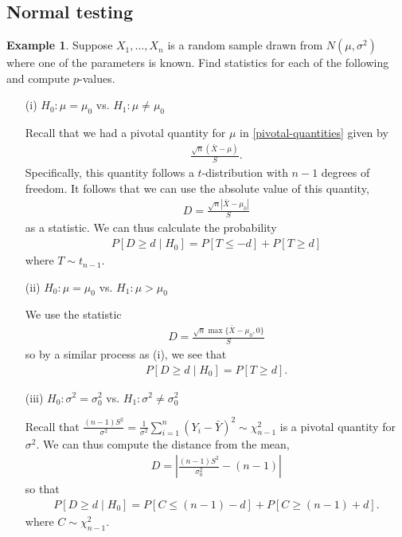 \documentclass[11pt]{amsart}
\theoremstyle{definition}
\newtheorem{example}[theorem]{Example}
\numberwithin{equation}{section}
\begin{document}
\subsection{Normal testing}
\begin{example}
    Suppose $X_1,\ldots,X_n$ is a random sample drawn from $N(\mu,\sigma^2)$ where one of the parameters is known. Find statistics for each of the following and compute $p$-values.
    \begin{enumerate}
        \item [(i)] $H_0:\mu=\mu_0$ vs. $H_1:\mu\ne \mu_0$

        Recall that we had a pivotal quantity for $\mu$ in \ref{pivotal-quantities} given by
        \begin{align*}
            \frac{\sqrt{n}(\bar X-\mu)}{S}.
        \end{align*}
        Specifically, this quantity follows a $t$-distribution with $n-1$ degrees of freedom. It follows that we can use the absolute value of this quantity, 
        \begin{align*}
            D=\frac{\sqrt{n}|\bar X-\mu_0|}{S}
        \end{align*}
        as a statistic. We can thus calculate the probability
        \begin{align*}
            P[D\ge d\mid H_0]=P[T\le -d]+P[T\ge d]
        \end{align*}
        where $T\sim t_{n-1}$.
        \item [(ii)] $H_0:\mu=\mu_0$ vs. $H_1:\mu>\mu_0$

        We use the statistic 
        \begin{align*}
            D=\frac{\sqrt{n}\max\{\bar X-\mu_0,0\}}{S}
        \end{align*}
        so by a similar process as (i), we see that
        \begin{align*}
            P[D\ge d\mid H_0]=P[T\ge d].
        \end{align*}
        \item [(iii)] $H_0:\sigma^2=\sigma^2_0$ vs. $H_1:\sigma^2\ne \sigma_0^2$

        Recall that $\frac{(n-1)S^2}{\sigma^2}=\frac{1}{\sigma^2}\sum_{i=1}^n(Y_i-\bar Y)^2\sim \chi_{n-1}^2$ is a pivotal quantity for $\sigma^2$. We can thus compute the distance from the mean,
        \begin{align*}
            D=\left|\frac{(n-1)S^2}{\sigma_0^2}-(n-1)\right|
        \end{align*}
        so that 
        \begin{align*}
            P[D\ge d\mid H_0]=P[C\le (n-1)-d]+P[C\ge (n-1)+d].
        \end{align*}
        where $C\sim \chi_{n-1}^2$.
        

\end{enumerate}
\end{example}
\end{document}
